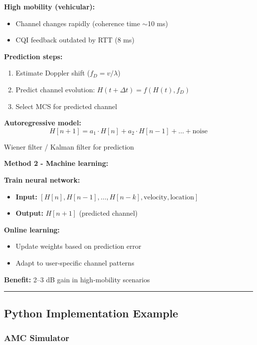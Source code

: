\textbf{High mobility (vehicular):}
\begin{itemize}
\item Channel changes rapidly (coherence time $\sim$10 ms)
\item CQI feedback outdated by RTT (8 ms)
\end{itemize}

\textbf{Prediction steps:}
\begin{enumerate}
\item Estimate Doppler shift ($f_D = v/\lambda$)
\item Predict channel evolution: $H(t + \Delta t) = f(H(t), f_D)$
\item Select MCS for predicted channel
\end{enumerate}

\textbf{Autoregressive model:}
\begin{equation*}
H[n+1] = a_1 \cdot H[n] + a_2 \cdot H[n-1] + \ldots + \text{noise}
\end{equation*}

Wiener filter / Kalman filter for prediction

\textbf{Method 2 - Machine learning:}

\textbf{Train neural network:}
\begin{itemize}
\item \textbf{Input:} $[H[n], H[n-1], \ldots, H[n-k], \text{velocity}, \text{location}]$
\item \textbf{Output:} $H[n+1]$ (predicted channel)
\end{itemize}

\textbf{Online learning:}
\begin{itemize}
\item Update weights based on prediction error
\item Adapt to user-specific channel patterns
\end{itemize}

\textbf{Benefit:} 2--3 dB gain in high-mobility scenarios

\begin{center}\rule{0.5\linewidth}{0.5pt}\end{center}

\subsection{Python Implementation Example}\label{python-implementation-example}

\subsubsection{AMC Simulator}\label{amc-simulator}

